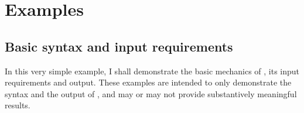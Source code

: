 \begin{stlog}
\nullskip
\end{stlog}


\clearpage\newpage


\section{Examples}
\label{sec:examples}

\subsection{Basic syntax and input requirements}
\label{subsec:basic}

In this very simple example, I shall demonstrate the basic mechanics of
, its input requirements and output.
These examples are intended to only demonstrate the syntax
and the output of , and may or may not provide
substantively meaningful results.


